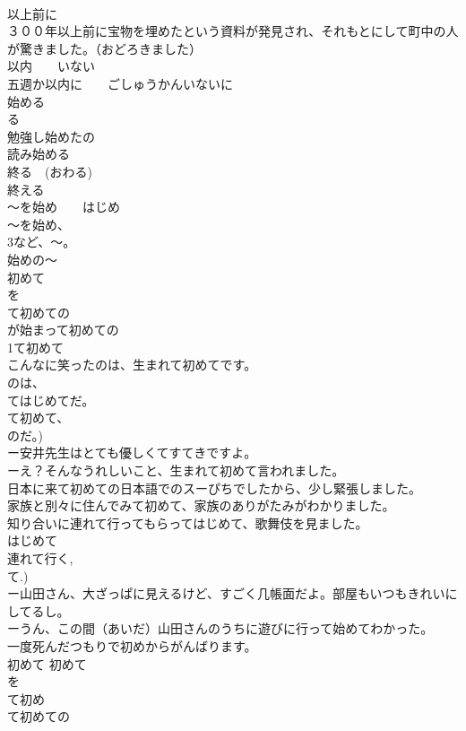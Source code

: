 \documentclass[8pt]{extreport}
\begin{document}
\begin{CJK}{UTF8}{min}
\\	以上前に
\\	３００年以上前に宝物を埋めたという資料が発見され、それもとにして町中の人が驚きました。（おどろきました）
\\	以内　　いない
\\	五週か以内に　　ごしゅうかんいないに
\\	始める
\\	る
\\	勉強し始めたの 
\\	読み始める　
\\	終る　(おわる) 
\\	終える 
\\	～を始め　　はじめ
\\	～を始め、
\\	3など、～。
\\	始めの～
\\	初めて
\\	を
\\	て初めての
\\	が始まって初めての
\\	1て初めて
\\	こんなに笑ったのは、生まれて初めてです。
\\	のは、
\\	てはじめてだ。 
\\	て初めて、
\\	のだ。)
\\	ー安井先生はとても優しくてすてきですよ。
\\	ーえ？そんなうれしいこと、生まれて初めて言われました。
\\	日本に来て初めての日本語でのスーぴちでしたから、少し緊張しました。
\\	家族と別々に住んでみて初めて、家族のありがたみがわかりました。
\\	知り合いに連れて行ってもらってはじめて、歌舞伎を見ました。
\\	はじめて 
\\	連れて行く, 
\\	て.)
\\	ー山田さん、大ざっぱに見えるけど、すごく几帳面だよ。部屋もいつもきれいにしてるし。
\\	ーうん、この間（あいだ）山田さんのうちに遊びに行って始めてわかった。
\\	一度死んだつもりで初めからがんばります。
\\	初めて	初めて
\\	を
\\	て初め
\\	て初めての

\end{CJK}
\end{document}
